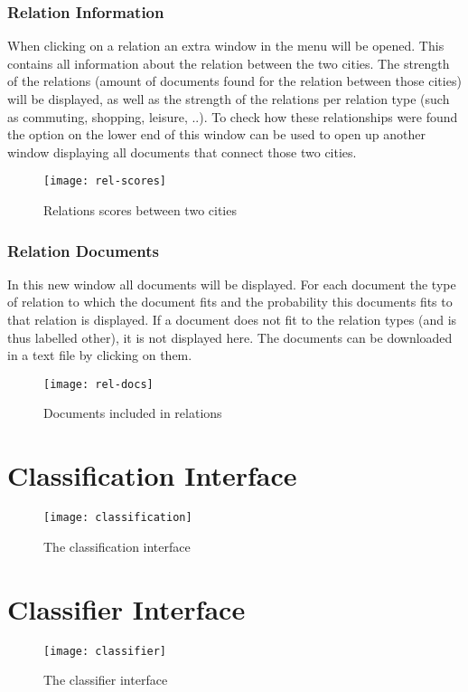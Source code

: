 \subsubsection{Relation Information}\label{sec:rel-info}

When clicking on a relation an extra window in the menu will be opened. This contains all information about the relation between the two cities. The strength of the relations (amount of documents found for the relation between those cities) will be displayed, as well as the strength of the relations per relation type (such as commuting, shopping, leisure, ..). To check how these relationships were found the option on the lower end of this window  can be used to open up another window displaying all documents that connect those two cities.

\begin{figure}[H]
    \centering
    \texttt{[image: rel-scores]}
    \caption{Relations scores between two cities}
    \label{fig:rel-scores}
\end{figure}

\subsubsection{Relation Documents}\label{sec:rel-docs}

In this new window all documents will be displayed. For each document the type of relation to which the document fits and the probability this documents fits to that relation is displayed. If a document does not fit to the relation types (and is thus labelled other), it is not displayed here. The documents can be downloaded in a text file by clicking on them.

\begin{figure}[H]
    \centering
    \texttt{[image: rel-docs]}
    \caption{Documents included in relations}
    \label{fig:rel-docs}
\end{figure}


\section{Classification Interface}

\begin{figure}[H]
    \centering
    \texttt{[image: classification]}
    \caption{The classification interface}
    \label{fig:classification}
\end{figure}

\section{Classifier Interface}

\begin{figure}[H]
    \centering
    \texttt{[image: classifier]}
    \caption{The classifier interface}
    \label{fig:classifier}
\end{figure}

